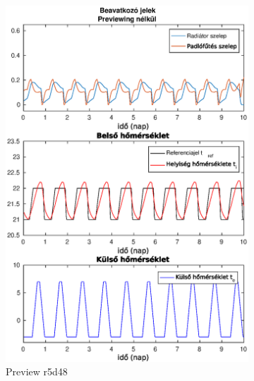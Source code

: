 \begin{figure}[H]
	\begin{subfigure}[t]{0.47\textwidth}
		\centering
		\includegraphics[trim=0 0 0 0, clip,width=\textwidth]{figures/onlab/compare/A_C_P5D48}
		\caption{Preview r5d48}
		\label{fig:mpc-pr5d48}
	\end{subfigure}
	~
	\begin{subfigure}[t]{0.51\textwidth}
		\centering

\end{subfigure}
\end{figure}
